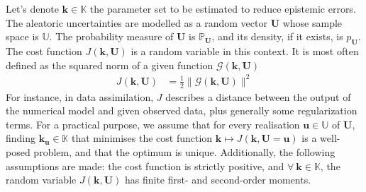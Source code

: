 \documentclass[preprint, 1p]{elsarticle}
\DeclareMathOperator*{\argmin}{arg\,min \,}
\newcommand{\Prob}{\mathbb{P}}
\newcommand{\kest}{\hat{\mathbf{k}}}
\newcommand{\Kspace}{\mathbb{K}}
\newcommand{\Uspace}{\mathbb{U}}
\newcommand{\arthur}[1]{{\itshape\color{cyan} ({#1})}}
\newcommand{\elise}[1]{{\itshape\color{red} ({#1})}}
\newcommand{\victor}[1]{{\itshape\color{green} ({#1})}}
\begin{document}


Let's denote $\mathbf{k} \in \Kspace$ the parameter set to be estimated to reduce epistemic errors. The aleatoric uncertainties are modelled as a random vector $\mathbf{U}$ whose sample space is $\Uspace$. The probability measure of $\mathbf{U}$ is $\Prob_{\mathbf{U}}$, and its density, if it exists, is $p_{\mathbf{U}}$. %
%
The cost function $J(\mathbf{k}, \mathbf{U})$ is a random variable in this context. %
It is most often defined as the squared norm of a given function $\mathcal{G}(\mathbf{k}, \mathbf{U})$%
\begin{align}
  \label{eq:def_cost_fun}
  J(\mathbf{k},\mathbf{U}) & = \frac12\|\mathcal{G}(\mathbf{k}, \mathbf{U})\|^2
  \end{align}
For instance, in data assimilation, $J$ describes a distance between the output of the numerical model and given observed data, plus generally some regularization terms.
%
%
For a practical purpose, we assume that for every realisation $\mathbf{u}\in\Uspace$ of $\mathbf{U}$, %
finding ${\mathbf{k}}_{\mathbf{u}}\in \Kspace$ that minimises the cost function $\mathbf{k}\mapsto J(\mathbf{k}, \mathbf{U}=\mathbf{u})$ is a well-posed problem, and that the optimum is unique.
Additionally, the following assumptions are made: the cost function is strictly positive, and $\forall~  \mathbf{k} \in \Kspace$, the random variable $J(\mathbf{k},\mathbf{U})$ has finite first- and second-order moments. 
 
\end{document}
